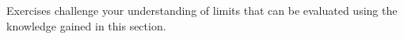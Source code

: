 {\noindent Exercises}
{ challenge your understanding of limits that can be evaluated using the knowledge gained in this section.}
